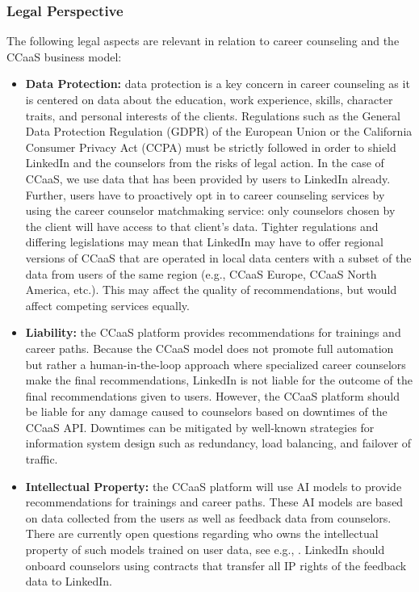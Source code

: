 \subsubsection{Legal Perspective}

The following legal aspects are relevant in relation to career counseling and the CCaaS business model:

\begin{itemize}
    \item \textbf{Data Protection:} data protection is a key concern in career counseling as it is 
        centered on data about the education, work experience, skills, character traits, and personal 
        interests of the clients. Regulations such as the General Data Protection Regulation (GDPR) of
        the European Union \citep{europeanparliamentRegulationEU20162016} or the California Consumer
        Privacy Act (CCPA) \citep{californiastatelegislatureTitle81California2018} must be strictly followed
        in order to shield LinkedIn and the counselors from the risks of legal action. In the case of 
        CCaaS, we use data that has been provided by users to LinkedIn already. Further, users have to
        proactively opt in to career counseling services by using the career counselor matchmaking service:
        only counselors chosen by the client will have access to that client's data.
        Tighter regulations and differing legislations may mean that LinkedIn may have to offer regional
        versions of CCaaS that are operated in local data centers with a subset of the data from users of
        the same region (e.g., CCaaS Europe, CCaaS North America, etc.). This may affect the quality of 
        recommendations, but would affect competing services equally.
    \item \textbf{Liability:} the CCaaS platform provides recommendations for trainings and career
        paths. Because the CCaaS model does not promote full automation but rather a human-in-the-loop
        approach where specialized career counselors make the final recommendations, LinkedIn is not 
        liable for the outcome of the final recommendations given to users. However, the CCaaS platform
        should be liable for any damage caused to counselors based on downtimes of the CCaaS API. Downtimes 
        can be mitigated by well-known strategies for information system design such as redundancy, load
        balancing, and failover of traffic.
    \item \textbf{Intellectual Property:} the CCaaS platform will use AI models to provide
        recommendations for trainings and career paths. These AI models are based on data collected
        from the users as well as feedback data from counselors. There are currently open questions
        regarding who owns the intellectual property of such models trained on user data, see e.g.,
        \citep{anwerIPChallengesDatafueled2021}. LinkedIn should onboard counselors using contracts 
        that transfer all IP rights of the feedback data to LinkedIn.
\end{itemize}


